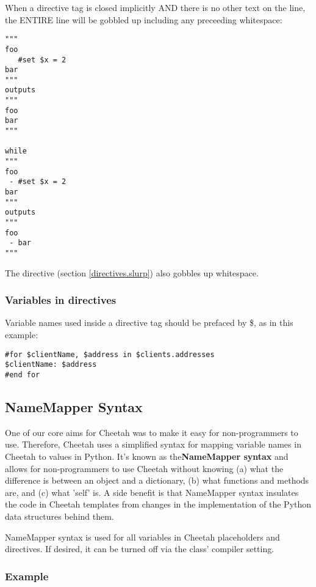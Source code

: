 When a directive tag is closed implicitly AND there is no other text on the
line, the ENTIRE line will be gobbled up including any preceeding whitespace:
\begin{verbatim}
"""
foo 
   #set $x = 2 
bar
"""
outputs 
"""
foo
bar
"""

while 
"""
foo 
 - #set $x = 2
bar
"""
outputs 
"""
foo 
 - bar
"""
\end{verbatim}

The  directive (section
\ref{directives.slurp}) also gobbles up whitespace.

\subsubsection{Variables in directives}
\label{language.directives.variables}

Variable names used inside a directive tag should be prefaced by \$, as in this
example:

\begin{verbatim}
#for $clientName, $address in $clients.addresses
$clientName: $address
#end for
\end{verbatim}


\subsection{NameMapper Syntax}
\label{language.namemapper}

One of our core aims for Cheetah was to make it easy for non-programmers to
use. Therefore, Cheetah uses a simplified syntax for mapping variable
names in Cheetah to values in Python. It's known as the{\bf NameMapper syntax}
and allows for non-programmers to use Cheetah without knowing (a)
what the difference is between an object and a dictionary, (b) what functions
and methods are, and (c) what 'self' is. A side benefit is that NameMapper
syntax insulates the code in Cheetah templates from changes in the implementation
of the Python data structures behind them.

NameMapper syntax is used for all variables in Cheetah placeholders and
directives. If desired, it can be turned off via the  class'
 compiler setting.

\subsubsection{Example}
\label{language.namemapper.example}

